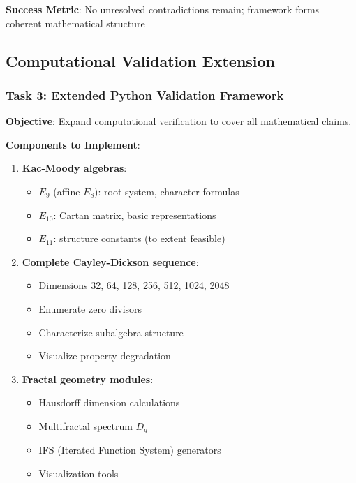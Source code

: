 \textbf{Success Metric}: No unresolved contradictions remain; framework forms coherent mathematical structure

\subsection{Computational Validation Extension}

\subsubsection{Task 3: Extended Python Validation Framework}

\textbf{Objective}: Expand computational verification to cover all mathematical claims.

\textbf{Components to Implement}:
\begin{enumerate}
    \item \textbf{Kac-Moody algebras}:
    \begin{itemize}
        \item $E_9$ (affine $E_8$): root system, character formulas
        \item $E_{10}$: Cartan matrix, basic representations
        \item $E_{11}$: structure constants (to extent feasible)
    \end{itemize}

    \item \textbf{Complete Cayley-Dickson sequence}:
    \begin{itemize}
        \item Dimensions 32, 64, 128, 256, 512, 1024, 2048
        \item Enumerate zero divisors
        \item Characterize subalgebra structure
        \item Visualize property degradation
    \end{itemize}

    \item \textbf{Fractal geometry modules}:
    \begin{itemize}
        \item Hausdorff dimension calculations
        \item Multifractal spectrum $D_q$
        \item IFS (Iterated Function System) generators
        \item Visualization tools
    \end{itemize}


\end{enumerate}
